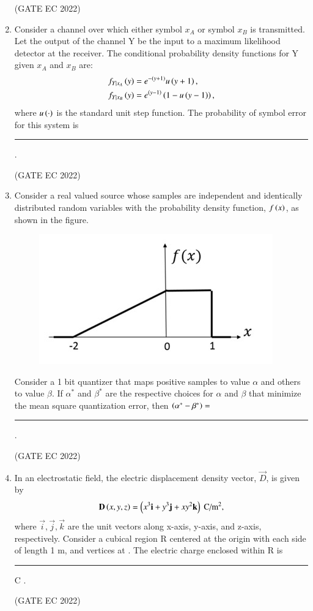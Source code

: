 \documentclass[journal,12pt,onecolumn]{IEEEtran}
\theoremstyle{remark}
\begin{document}
\begin{enumerate}
    \hfill{(GATE EC 2022)}

    \item Consider a channel over which either symbol $x_A$ or symbol $x_B$ is transmitted. Let the output of the channel Y be the input to a maximum likelihood  detector at the receiver. The conditional probability density functions for Y given $x_A$ and $x_B$ are:
    \begin{align*}
        f_{Y|x_A}\left(y\right) &= e^{-\left(y+1\right)}u\left(y+1\right), \\
        f_{Y|x_B}\left(y\right) &= e^{\left(y-1\right)}\left(1-u\left(y-1\right)\right),
    \end{align*}
    where $u\left(\cdot\right)$ is the standard unit step function. The probability of symbol error for this system is \rule{2cm}{0.4pt} .
    
    \hfill{(GATE EC 2022)}
    
    \item Consider a real valued source whose samples are independent and identically distributed random variables with the probability density function, $f\left(x\right)$, as shown in the figure. 
    \begin{figure}[H]
        \centering
        \includegraphics[width=0.4\columnwidth]{figs/m33.jpg}
        \caption*{}
        \label{fig:m33}
    \end{figure}
    Consider a 1 bit quantizer that maps positive samples to value $\alpha$ and others to value $\beta$. If $\alpha^*$ and $\beta^*$ are the respective choices for $\alpha$ and $\beta$ that minimize the mean square quantization error, then $\left(\alpha^* - \beta^*\right) = $ \rule{2cm}{0.4pt} .
    
    \hfill{(GATE EC 2022)}

    \item In an electrostatic field, the electric displacement density vector, $\vec{D}$, is given by
    \begin{align*}
     \mathbf{D}\left(x, y, z\right) = \left(x^3\mathbf{i} + y^3\mathbf{j} + xy^2\mathbf{k}\right) \text{ C/m}^2,
     \end{align*}
    where $\vec{i}, \vec{j}, \vec{k}$ are the unit vectors along x-axis, y-axis, and z-axis, respectively. Consider a cubical region R centered at the origin with each side of length 1 m, and vertices at . The electric charge enclosed within R is \rule{2cm}{0.4pt} C .
    
    \hfill{(GATE EC 2022)}

\end{enumerate}
\end{document}
